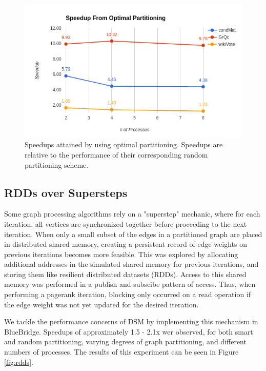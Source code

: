 \begin{figure}[h]
\includegraphics[width=\linewidth]{"fig/smart_vs_rand"}
\caption{Speedups attained by using optimal partitioning. Speedups are relative
to the performance of their corresponding random partitioning scheme.}
\label{fig:smart_rand}
\end{figure}

\subsection{RDDs over Supersteps}

Some graph processing algorithms rely on a "superstep" mechanic, where for
each iteration, all vertices are synchronized together before proceeding to the
next iteration. When only a small subset of the edges in a partitioned graph 
are placed in distributed shared memory, creating a persistent record of edge
weights on previous iterations becomes more feasible. This was explored by
allocating additional addresses in the simulated shared memory for previous 
iterations, and storing them like resilient distributed datasets (RDDs). Access
to this shared memory was performed in a publish and subscibe pattern of access.
Thus, when performing a pagerank iteration, blocking only occurred on a read
operation if the edge weight was not yet updated for the desired iteration.

We tackle the performance concerns of DSM by implementing this mechanism
in BlueBridge. Speedups of approximately 1.5 - 2.1x wer observed, for both smart
and random partitioning, varying degrees of graph partitioning, and different
numbers of processes. The results of this experiment can be seen in Figure
\ref{fig:rdds}.

